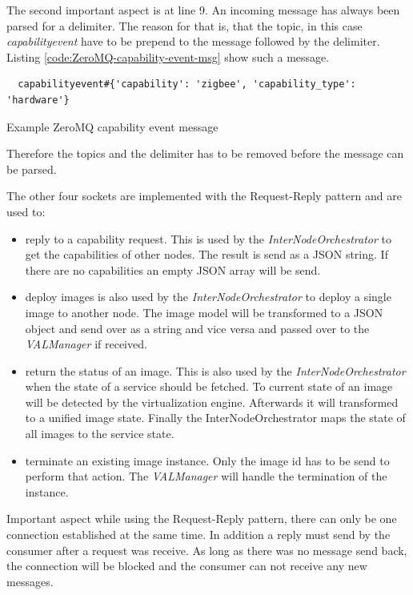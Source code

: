 The second important aspect is at line 9.
An incoming message has always been parsed for a delimiter.
The reason for that is, that the topic, in this case \textit{capabilityevent} have to be prepend to the message followed by the delimiter.
Listing \ref{code:ZeroMQ-capability-event-msg} show such a message.
\begin{listing}[H]
  \begin{verbatim}
  capabilityevent#{'capability': 'zigbee', 'capability_type': 'hardware'}
  \end{verbatim}
  \caption{Example ZeroMQ capability event message}
  \label{code:ZeroMQ-capability-event-msg}
\end{listing}
Therefore the topics and the delimiter has to be removed before the message can be parsed.\newline

The other four sockets are implemented with the Request-Reply pattern and are used to:
\begin{itemize}
  \item reply to a capability request.
  This is used by the \textit{InterNodeOrchestrator} to get the capabilities of other nodes.
  The result is send as a \ac{JSON} string.
  If there are no capabilities an empty \ac{JSON} array will be send.
  \item deploy images is also used by the \textit{InterNodeOrchestrator} to deploy a single image to another node.
  The image model will be transformed to a \ac{JSON} object and send over as a string and vice versa and passed over to the \textit{VALManager} if received.
  \item return the status of an image. This is also used by the \textit{InterNodeOrchestrator} when the state of a service should be fetched. To current state of an image will be detected by the virtualization engine. Afterwards it will transformed to a unified image state. Finally the InterNodeOrchestrator maps the state of all images to the service state.
  \item terminate an existing image instance.
  Only the image id has to be send to perform that action.
  The \textit{VALManager} will handle the termination of the instance.
\end{itemize}
\bigskip

Important aspect while using the Request-Reply pattern, there can only be one connection established at the same time.
In addition a reply must send by the consumer after a request was receive.
As long as there was no message send back, the connection will be blocked and the consumer can not receive any new messages.\newline

